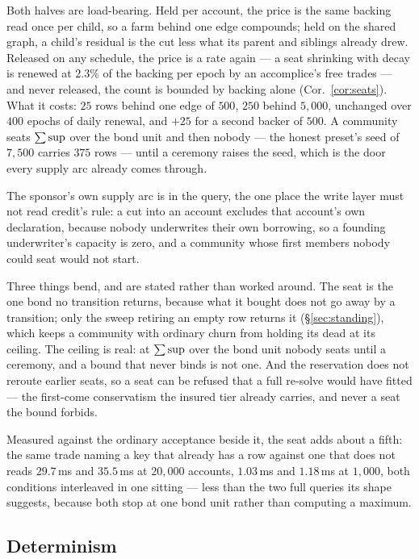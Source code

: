 Both halves are load-bearing. Held per account, the price is the same backing read once
per child, so a farm behind one edge compounds; held on the shared graph, a child's
residual is the cut less what its parent and siblings already drew. Released on any
schedule, the price is a rate again --- a seat shrinking with decay is renewed at $2.3\%$
of the backing per epoch by an accomplice's free trades --- and never released, the count
is bounded by backing alone (Cor.~\ref{cor:seats}). What it costs: $25$ rows behind one
edge of $500$, $250$ behind $5{,}000$, unchanged over $400$ epochs of daily renewal, and
$+25$ for a second backer of $500$. A community seats $\sum \mathrm{sup}$ over the bond unit
and then nobody --- the honest preset's seed of $7{,}500$ carries $375$ rows --- until a
ceremony raises the seed, which is the door every supply arc already comes through.

The sponsor's own supply arc is in the query, the one place the write layer must not read
credit's rule: a cut into an account excludes that account's own declaration, because
nobody underwrites their own borrowing, so a founding underwriter's capacity is zero, and
a community whose first members nobody could seat would not start.

Three things bend, and are stated rather than worked around. The seat is the one bond no
transition returns, because what it bought does not go away by a transition; only the
sweep retiring an empty row returns it (\S\ref{sec:standing}), which keeps a community
with ordinary churn from holding its dead at its ceiling. The ceiling is real: at
$\sum \mathrm{sup}$ over the bond unit nobody seats until a ceremony, and a bound that never
binds is not one. And the reservation does not reroute earlier seats, so a seat can be
refused that a full re-solve would have fitted --- the first-come conservatism the insured
tier already carries, and never a seat the bound forbids.

Measured against the ordinary acceptance beside it, the seat adds about a fifth: the same
trade naming a key that already has a row against one that does not reads $29.7$\,ms and
$35.5$\,ms at $20{,}000$ accounts, $1.03$\,ms and $1.18$\,ms at $1{,}000$, both conditions
interleaved in one sitting --- less than the two full queries its shape suggests, because
both stop at one bond unit rather than computing a maximum.

\subsection{Determinism}

